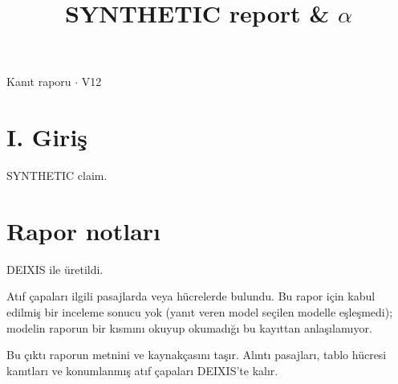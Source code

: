 \documentclass[journal]{IEEEtran}
\begin{document}
\renewcommand{\abstractname}{Özet}
\renewcommand{\IEEEkeywordsname}{Dizin Terimleri}
\renewcommand{\refname}{Kaynaklar}

\title{SYNTHETIC report \& \ensuremath{\alpha}}

\maketitle

\noindent Kanıt raporu \ensuremath{\cdot} V12

\section*{I. Giriş}

SYNTHETIC claim. \cite{Synth26}

\section*{Rapor notları}

DEIXIS ile üretildi.

Atıf çapaları ilgili pasajlarda veya hücrelerde bulundu. Bu rapor için kabul edilmiş bir inceleme sonucu yok (yanıt veren model seçilen modelle eşleşmedi); modelin raporun bir kısmını okuyup okumadığı bu kayıttan anlaşılamıyor.

Bu çıktı raporun metnini ve kaynakçasını taşır. Alıntı pasajları, tablo hücresi kanıtları ve konumlanmış atıf çapaları DEIXIS'te kalır.




\end{document}
